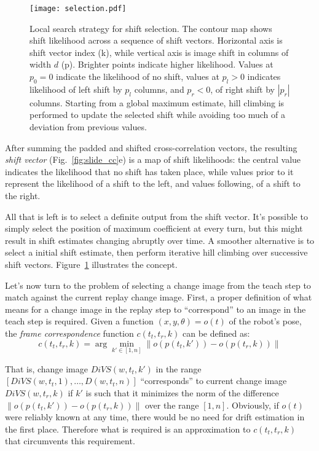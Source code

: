 \documentclass[twocolumn, 9pt,fleqn]{jsproceedings}
\begin{document}
\begin{figure}[h!]
\texttt{[image: selection.pdf]}
\caption{Local search strategy for shift selection. The contour map shows shift likelihood across a sequence of shift vectors. Horizontal axis is shift vector index (k), while vertical axis is image shift in columns of width $d$ (p). Brighter points indicate higher likelihood. Values at $p_0 = 0$ indicate the likelihood of no shift, values at $p_l > 0$ indicates likelihood of left shift by $p_l$ columns, and $p_r < 0$, of right shift by $|p_r|$ columns. Starting from a global maximum estimate, hill climbing is performed to update the selected shift while avoiding too much of a deviation from previous values.}
\label{fig:selection}
\end{figure}

After summing the padded and shifted cross-correlation vectors, the resulting \textit{shift vector} (Fig.~\ref{fig:slide_cc}e) is a map of shift likelihoods: the central value indicates the likelihood that no shift has taken place, while values prior to it represent the likelihood of a shift to the left, and values following, of a shift to the right.

All that is left is to select a definite output from the shift vector. It's possible to simply select the position of maximum coefficient at every turn, but this might result in shift estimates changing abruptly over time. A smoother alternative is to select a initial shift estimate, then perform iterative hill climbing over successive shift vectors. Figure~\ref{fig:selection} illustrates the concept.

Let's now turn to the problem of selecting a change image from the teach step to match against the current replay change image. First, a proper definition of what means for a change image in the replay step to ``correspond'' to an image in the teach step is required. Given a function $(x, y, \theta) = o(t)$ of the robot's pose, the \textit{frame correspondence} function $c(t_t, t_r, k)$ can be defined as:
\begin{equation}
c(t_t, t_r, k) = \arg \min_{k' \in [1, n]} {\| o(p(t_t, k')) - o(p(t_r, k)) \|}
\end{equation}

That is, change image $DiVS(w, t_t, k')$ in the range $[DiVS(w, t_t, 1), \dotsc, D(w, t_t, n)]$ ``corresponds'' to current change image $DiVS(w, t_r, k)$ if $k'$ is such that it minimizes the norm of the difference $\| o(p(t_t, k')) - o(p(t_r, k)) \|$ over the range $[1, n]$. Obviously, if $o(t)$ were reliably known at any time, there would be no need for drift estimation in the first place. Therefore what is required is an approximation to $c(t_t, t_r, k)$ that circumvents this requirement.
\end{document}
